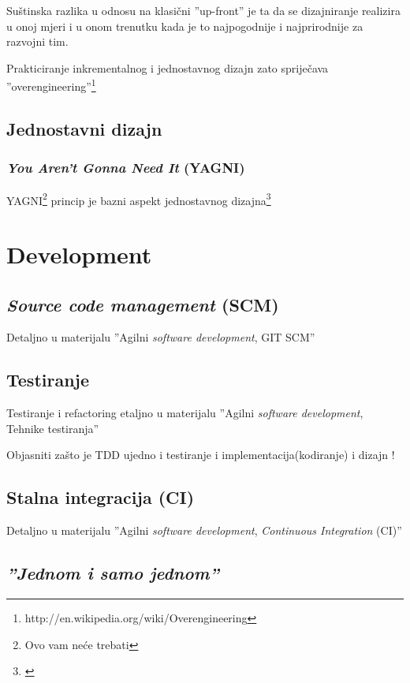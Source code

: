 \documentclass[lmodern, utf8, zavrsni]{fit}
\begin{document}
Suštinska razlika u odnosu na klasični ''up-front'' je ta da se dizajniranje realizira u onoj mjeri i u onom trenutku kada je to najpogodnije i najprirodnije za razvojni tim.

Prakticiranje inkrementalnog i jednostavnog dizajn zato spriječava ''overengineering''\footnote{http://en.wikipedia.org/wiki/Overengineering}

\section{Jednostavni dizajn}

\subsection{\emph{You Aren't Gonna Need It} (YAGNI)}

YAGNI\footnote{Ovo vam neće trebati} princip je bazni aspekt jednostavnog dizajna\footnote{\citep[str. 318]{agileart}}


\chapter{Development}

\section{\emph{Source code management} (SCM)}

Detaljno u materijalu ''Agilni \emph{software development}, GIT SCM''\citep{agilegit}

\section{Testiranje}

Testiranje i refactoring etaljno u materijalu ''Agilni \emph{software development}, Tehnike testiranja''\citep{agiletest}

Objasniti zašto je TDD ujedno i testiranje i implementacija(kodiranje) i dizajn !

\section{Stalna integracija (CI)}

Detaljno u materijalu ''Agilni \emph{software development}, \emph{Continuous Integration} (CI)''\citep{agileci}

\section{\emph{''Jednom i samo jednom''}}
\end{document}
